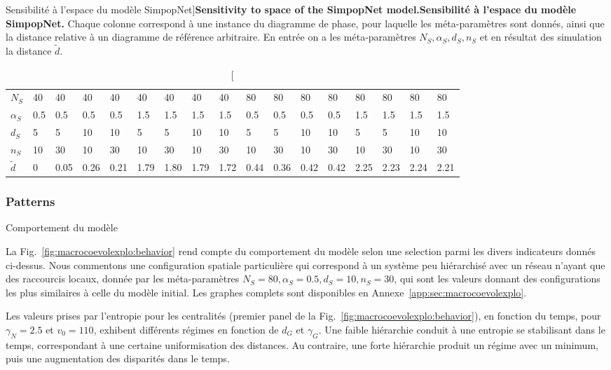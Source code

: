\begin{table}[!ht]
\caption[Sensitivity to space of the SimpopNet model][Sensibilité à l'espace du modèle SimpopNet]{\textbf{Sensitivity to space of the SimpopNet model.}\label{tab:macrocoevolexplo:spacematters}}{\textbf{Sensibilité à l'espace du modèle SimpopNet.} Chaque colonne correspond à une instance du diagramme de phase, pour laquelle les méta-paramètres sont donnés, ainsi que la distance relative à un diagramme de référence arbitraire. En entrée on a les méta-paramètres $N_S,\alpha_S,d_S,n_S$ et en résultat des simulation la distance $\tilde{d}$.\label{tab:macrocoevolexplo:spacematters}}
\begin{tabular}{|l|l|l|l|l|l|l|l|l|l|l|l|l|l|l|l|l|}
\hline
$N_S$ & 40 & 40 & 40 & 40 & 40 & 40 & 40 & 40 & 80 & 80 & 80 & 80 & 80 & 80 & 80 & 80\\
$\alpha_S$ & 0.5 & 0.5 & 0.5 & 0.5 & 1.5 & 1.5 & 1.5 & 1.5 & 0.5 & 0.5 & 0.5 & 0.5 & 1.5 & 1.5 & 1.5 & 1.5\\
$d_S$ & 5 & 5 & 10 & 10 & 5 & 5 & 10 & 10 & 5 & 5 & 10 & 10 & 5 & 5 & 10 & 10\\
$n_S$ & 10 & 30 & 10 & 30 & 10 & 30 & 10 & 30 & 10 & 30 & 10 & 30 & 10 & 30 & 10 & 30\\\hline
$\tilde{d}$ & 0 & 0.05 & 0.26 & 0.21 & 1.79 & 1.80 & 1.79 & 1.72 & 0.44 & 0.36 & 0.42 & 0.42 & 2.25 & 2.23 & 2.24 & 2.21\\\hline
\end{tabular}
\end{table}



\subsubsection{Patterns}{Comportement du modèle}



La Fig.~\ref{fig:macrocoevolexplo:behavior} rend compte du comportement du modèle selon une selection parmi les divers indicateurs donnés ci-dessus. Nous commentons une configuration spatiale particulière qui correspond à un système peu hiérarchisé avec un réseau n'ayant que des raccourcis locaux, donnée par les méta-paramètres $N_S=80,\alpha_S=0.5,d_S=10,n_S=30$, qui sont les valeurs donnant des configurations les plus similaires à celle du modèle initial. Les graphes complets sont disponibles en Annexe~\ref{app:sec:macrocoevolexplo}.


Les valeurs prises par l'entropie pour les centralités (premier panel de la Fig.~\ref{fig:macrocoevolexplo:behavior}), en fonction du temps, pour $\gamma_N = 2.5$ et $v_0 = 110$, exhibent différents régimes en fonction de $d_G$ et $\gamma_G$. Une faible hiérarchie conduit à une entropie se stabilisant dans le temps, correspondant à une certaine uniformisation des distances. Au contraire, une forte hiérarchie produit un régime avec un minimum, puis une augmentation des disparités dans le temps.



